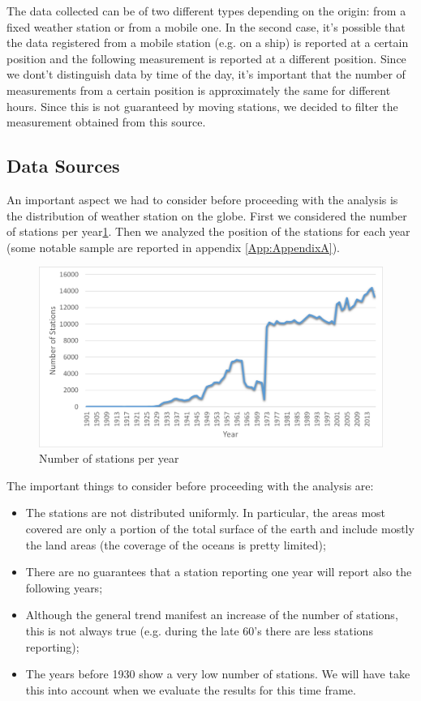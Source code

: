 \documentclass{vldb}
\begin{document}
The data collected can be of two different types depending on the origin: from a fixed weather station or from a mobile one. In the second case, it's possible that the data registered from a mobile station (e.g. on a ship) is reported at a certain position and the following measurement is reported at a different position. Since we dont't distinguish data by time of the day, it's important that the number of measurements from a certain position is approximately the same for different hours. Since this is not guaranteed by moving stations, we decided to filter the measurement obtained from this source. \\

\subsection{Data Sources}
An important aspect we had to consider before proceeding with the analysis is the distribution of weather station on the globe. First we considered the number of stations per year\ref{fig:stations}. Then we analyzed the position of the stations for each year (some notable sample are reported in appendix \ref{App:AppendixA}).

\begin{figure}[tbh]
\includegraphics[width=1\linewidth]{stations}
\caption{Number of stations per year}
\label{fig:stations}
\end{figure}

The important things to consider before proceeding with the analysis are:
\begin{itemize}
    \item The stations are not distributed uniformly. In particular, the areas most covered are only a portion of the total surface of the earth and include mostly the land areas (the coverage of the oceans is pretty limited);
    \item There are no guarantees that a station reporting one year will report also the following years;
    \item Although the general trend manifest an increase of the number of stations, this is not always true (e.g. during the late 60's there are less stations reporting);
    \item The years before 1930 show a very low number of stations. We will have take this into account when we evaluate the results for this time frame.
\end{itemize}
\end{document}
